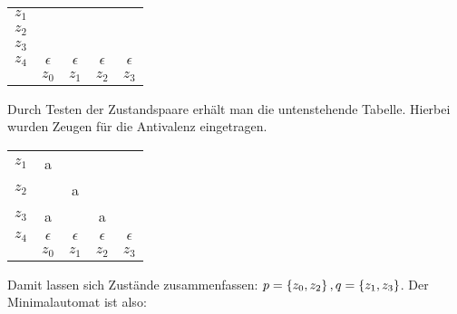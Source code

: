 \begin{tabular}{ccccc}
	\cline{2-2}
	$z_1$ & 	\multicolumn{1}{|c|}{ }		&				&				&			 \\
	\cline{2-3}
	$z_2$ & 	\multicolumn{1}{|c|}{ }		&		\multicolumn{1}{c|}{ }		&				&			 \\
	\cline{2-4}
	$z_3$ & 	\multicolumn{1}{|c|}{ }		&		\multicolumn{1}{c|}{ }		&		\multicolumn{1}{c|}{ }		&			 \\
	\cline{2-5}
	$z_4$ & 	\multicolumn{1}{|c|}{$\epsilon$}		&		\multicolumn{1}{c|}{$\epsilon$}		&		\multicolumn{1}{c|}{$\epsilon$}		&		\multicolumn{1}{c|}{$\epsilon$}	 \\
	\cline{2-5}
				& $z_0$ & $z_1$ & $z_2$ & $z_3$\\
\end{tabular}

Durch Testen der Zustandspaare erhält man die untenstehende Tabelle. Hierbei wurden Zeugen für die Antivalenz eingetragen.

\begin{tabular}{ccccc}
	\cline{2-2}
	$z_1$ & 	\multicolumn{1}{|c|}{a}		&				&				&			 \\
	\cline{2-3}
	$z_2$ & 	\multicolumn{1}{|c|}{ }		&		\multicolumn{1}{c|}{a}		&				&			 \\
	\cline{2-4}
	$z_3$ & 	\multicolumn{1}{|c|}{a}		&		\multicolumn{1}{c|}{ }		&		\multicolumn{1}{c|}{a}		&			 \\
	\cline{2-5}
	$z_4$ & 	\multicolumn{1}{|c|}{$\epsilon$}		&		\multicolumn{1}{c|}{$\epsilon$}		&		\multicolumn{1}{c|}{$\epsilon$}		&		\multicolumn{1}{c|}{$\epsilon$}	 \\
	\cline{2-5}
				& $z_0$ & $z_1$ & $z_2$ & $z_3$\\
\end{tabular}

Damit lassen sich Zustände zusammenfassen: $p=\left\{ z_0,z_2 \right\}, q=\left\{ z_1,z_3 \right\}$. Der Minimalautomat ist also:

\vspace{1em}

